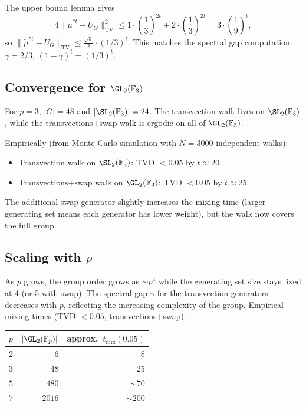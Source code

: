 The upper bound lemma gives
\[
  4\|\tilde\mu^{*t} - U_G\|_{\mathrm{TV}}^2
  \leq 1 \cdot \left(\frac{1}{3}\right)^{2t} + 2 \cdot \left(\frac{1}{3}\right)^{2t}
  = 3 \cdot \left(\frac{1}{9}\right)^t,
\]
so $\|\tilde\mu^{*t} - U_G\|_{\mathrm{TV}} \leq \frac{\sqrt{3}}{2} \cdot (1/3)^t$.
This matches the spectral gap computation: $\gamma = 2/3$, $(1-\gamma)^t = (1/3)^t$.

\subsection{Convergence for $\GL_2(\mathbb{F}_3)$}

For $p = 3$, $|G| = 48$ and $|\SL_2(\mathbb{F}_3)| = 24$.
The transvection walk lives on $\SL_2(\mathbb{F}_3)$, while the
transvections+swap walk is ergodic on all of $\GL_2(\mathbb{F}_3)$.

Empirically (from Monte Carlo simulation with $N = 3000$ independent walks):
\begin{itemize}
  \item Transvection walk on $\SL_2(\mathbb{F}_3)$: TVD $< 0.05$ by $t \approx 20$.
  \item Transvections+swap walk on $\GL_2(\mathbb{F}_3)$: TVD $< 0.05$ by $t \approx 25$.
\end{itemize}
The additional swap generator slightly increases the mixing time (larger
generating set means each generator has lower weight), but the walk now covers
the full group.

\subsection{Scaling with $p$}

As $p$ grows, the group order grows as $\sim p^4$ while the generating set size
stays fixed at 4 (or 5 with swap).
The spectral gap $\gamma$ for the transvection generators decreases with $p$,
reflecting the increasing complexity of the group.
Empirical mixing times (TVD $< 0.05$, transvections+swap):

\begin{center}
\begin{tabular}{r r r}
\hline
$p$ & $|\GL_2(\mathbb{F}_p)|$ & approx.\ $t_{\mathrm{mix}}(0.05)$ \\
\hline
$2$ & $6$ & $8$ \\
$3$ & $48$ & $25$ \\
$5$ & $480$ & $\sim 70$ \\
$7$ & $2016$ & $\sim 200$ \\
\hline
\end{tabular}
\end{center}

